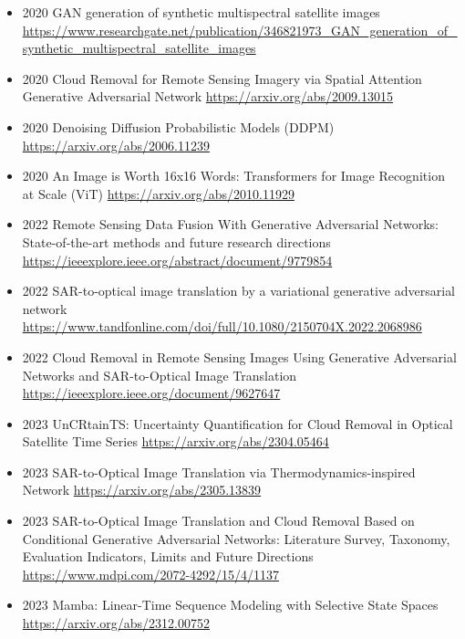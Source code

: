 \begin{itemize}
    \item 2020 GAN generation of synthetic multispectral satellite images
    \url{https://www.researchgate.net/publication/346821973_GAN_generation_of_synthetic_multispectral_satellite_images}
    
    \item 2020 Cloud Removal for Remote Sensing Imagery via Spatial Attention Generative Adversarial Network
    \url{https://arxiv.org/abs/2009.13015}

    \item 2020 Denoising Diffusion Probabilistic Models (DDPM)
    \url{https://arxiv.org/abs/2006.11239}

    \item 2020 An Image is Worth 16x16 Words: Transformers for Image Recognition at Scale (ViT)
    \url{https://arxiv.org/abs/2010.11929}

    \item 2022 Remote Sensing Data Fusion With Generative Adversarial Networks: State-of-the-art methods and future research directions
    \url{https://ieeexplore.ieee.org/abstract/document/9779854}

    \item 2022 SAR-to-optical image translation by a variational generative adversarial network
    \url{https://www.tandfonline.com/doi/full/10.1080/2150704X.2022.2068986}

    \item 2022 Cloud Removal in Remote Sensing Images Using Generative Adversarial Networks and SAR-to-Optical Image Translation
    \url{https://ieeexplore.ieee.org/document/9627647}

    \item 2023 UnCRtainTS: Uncertainty Quantification for Cloud Removal in Optical Satellite Time Series
    \url{https://arxiv.org/abs/2304.05464}

    \item 2023 SAR-to-Optical Image Translation via Thermodynamics-inspired Network
    \url{https://arxiv.org/abs/2305.13839}
    
    \item 2023 SAR-to-Optical Image Translation and Cloud Removal Based on Conditional Generative Adversarial Networks: Literature Survey, Taxonomy, Evaluation Indicators, Limits and Future Directions
    \url{https://www.mdpi.com/2072-4292/15/4/1137}

    \item 2023 Mamba: Linear-Time Sequence Modeling with Selective State Spaces
    \url{https://arxiv.org/abs/2312.00752}
    

\end{itemize}
